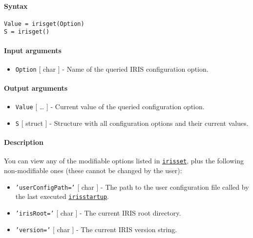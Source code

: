 


	\paragraph{Syntax}\label{syntax}

\begin{verbatim}
Value = irisget(Option)
S = irisget()
\end{verbatim}

\paragraph{Input arguments}\label{input-arguments}

\begin{itemize}
\itemsep1pt\parskip0pt
\item
  \texttt{Option} {[} char {]} - Name of the queried IRIS configuration
  option.
\end{itemize}

\paragraph{Output arguments}\label{output-arguments}

\begin{itemize}
\item
  \texttt{Value} {[} \ldots{} {]} - Current value of the queried
  configuration option.
\item
  \texttt{S} {[} struct {]} - Structure with all configuration options
  and their current values.
\end{itemize}

\paragraph{Description}\label{description}

You can view any of the modifiable options listed in
\href{config/irisset}{\texttt{irisset}}, plus the following
non-modifiable ones (these cannot be changed by the user):

\begin{itemize}
\item
  \texttt{'userConfigPath='} {[} char {]} - The path to the user
  configuration file called by the last executed
  \href{config/irisstartup}{\texttt{irisstartup}}.
\item
  \texttt{'irisRoot='} {[} char {]} - The current IRIS root directory.
\item
  \texttt{'version='} {[} char {]} - The current IRIS version string.
\end{itemize}

